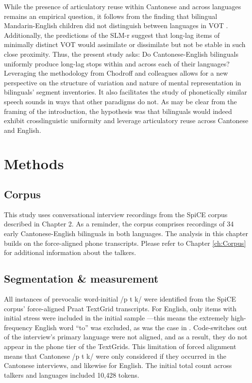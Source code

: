 While the presence of articulatory reuse within Cantonese and across languages remains an empirical question, it follows from the finding that bilingual Mandarin-English children did not distinguish between languages in VOT \citep{yang_2019_vot}. Additionally, the predictions of the SLM-r \citep{flege_2021_slmr} suggest that long-lag items of minimally distinct VOT would assimilate or dissimilate but not be stable in such close proximity. Thus, the present study asks: Do Cantonese-English bilinguals uniformly produce long-lag stops within and across each of their languages? Leveraging the methodology from Chodroff and colleagues \citep{chodroff_2017_structure, chodroff_2018_predictability, chodroff_2019_l2} allows for a new perspective on the structure of variation and nature of mental representation in bilinguals' segment inventories. It also facilitates the study of phonetically similar speech sounds in ways that other paradigms do not. As may be clear from the framing of the introduction, the hypothesis was that bilinguals would indeed exhibit crosslinguistic uniformity and leverage articulatory reuse across Cantonese and English.

\section{Methods}

\subsection{Corpus}
This study uses conversational interview recordings from the SpiCE corpus described in Chapter 2. As a reminder, the corpus comprises recordings of 34 early Cantonese-English bilinguals in both languages. The analysis in this chapter builds on the force-aligned phone transcripts. Please refer to Chapter \ref{ch:Corpus} for additional information about the talkers. 

\subsection{Segmentation \& measurement}

All instances of prevocalic word-initial /p t k/ were identified from the SpiCE corpus' force-aligned Praat TextGrid transcripts. For English, only items with initial stress were included in the initial sample \citep{lisker_1967_some}---this means the extremely high-frequency English word ``to'' was excluded, as was the case in \citet{chodroff_2017_structure}. Code-switches out of the interview's primary language were not aligned, and as a result, they do not appear in the phone tier of the TextGrids. This limitation of forced alignment means that Cantonese /p t k/ were only considered if they occurred in the Cantonese interviews, and likewise for English. The initial total count across talkers and languages included 10,428 tokens. 

